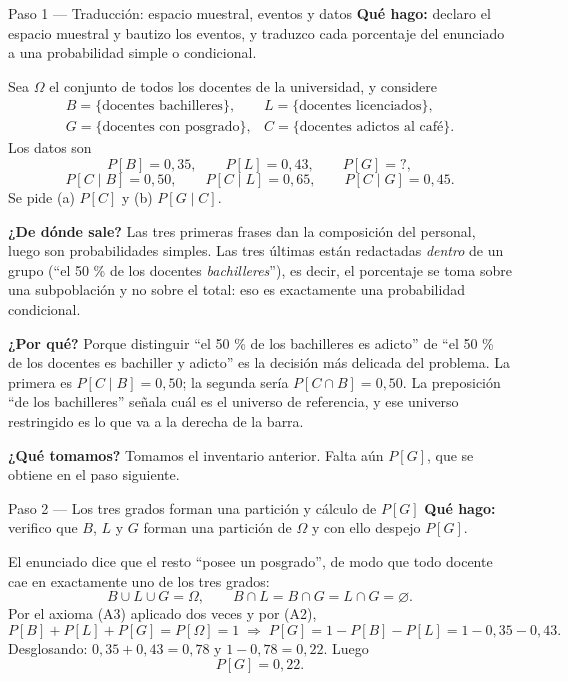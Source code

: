 \documentclass[11pt]{article}
\begin{document}
\begin{sol}

\begin{paso}{Paso 1 --- Traducci\'on: espacio muestral, eventos y datos}
\textbf{Qu\'e hago:} declaro el espacio muestral y bautizo los eventos, y traduzco cada porcentaje del enunciado a una probabilidad simple o condicional.

Sea $\Omega$ el conjunto de todos los docentes de la universidad, y considere
\[
\begin{array}{ll}
B=\{\text{docentes bachilleres}\}, & L=\{\text{docentes licenciados}\},\\[2pt]
G=\{\text{docentes con posgrado}\}, & C=\{\text{docentes adictos al caf\'e}\}.
\end{array}
\]
Los datos son
\[
P[B]=0{,}35,\qquad P[L]=0{,}43,\qquad P[G]=?,
\]
\[
P[C\mid B]=0{,}50,\qquad P[C\mid L]=0{,}65,\qquad P[C\mid G]=0{,}45 .
\]
Se pide (a) $P[C]$ y (b) $P[G\mid C]$.

\textbf{¿De d\'onde sale?} Las tres primeras frases dan la composici\'on del personal, luego son probabilidades simples. Las tres \'ultimas est\'an redactadas \emph{dentro} de un grupo (``el 50 \% de los docentes \emph{bachilleres}''), es decir, el porcentaje se toma sobre una subpoblaci\'on y no sobre el total: eso es exactamente una probabilidad condicional.

\textbf{¿Por qu\'e?} Porque distinguir ``el 50 \% de los bachilleres es adicto'' de ``el 50 \% de los docentes es bachiller y adicto'' es la decisi\'on m\'as delicada del problema. La primera es $P[C\mid B]=0{,}50$; la segunda ser\'ia $P[C\cap B]=0{,}50$. La preposici\'on ``de los bachilleres'' se\~nala cu\'al es el universo de referencia, y ese universo restringido es lo que va a la derecha de la barra.

\textbf{¿Qu\'e tomamos?} Tomamos el inventario anterior. Falta a\'un $P[G]$, que se obtiene en el paso siguiente.
\end{paso}

\begin{paso}{Paso 2 --- Los tres grados forman una partici\'on y c\'alculo de $P[G]$}
\textbf{Qu\'e hago:} verifico que $B$, $L$ y $G$ forman una partici\'on de $\Omega$ y con ello despejo $P[G]$.

El enunciado dice que el resto ``posee un posgrado'', de modo que todo docente cae en exactamente uno de los tres grados:
\[
B\cup L\cup G=\Omega,
\qquad
B\cap L=B\cap G=L\cap G=\varnothing .
\]
Por el axioma (A3) aplicado dos veces y por (A2),
\[
P[B]+P[L]+P[G]=P[\Omega]=1
\;\Longrightarrow\;
P[G]=1-P[B]-P[L]=1-0{,}35-0{,}43 .
\]
Desglosando: $0{,}35+0{,}43=0{,}78$ y $1-0{,}78=0{,}22$. Luego
\[
P[G]=0{,}22 .
\]


\end{paso}
\end{sol}
\end{document}
